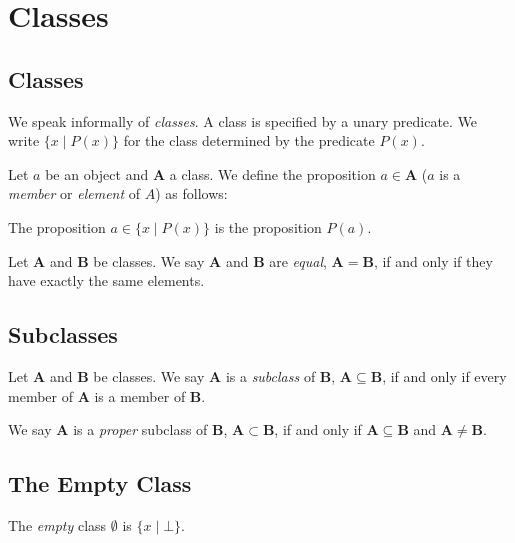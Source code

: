 \chapter{Classes}

\section{Classes}

We speak informally of \emph{classes}. A class is specified by a unary predicate.
We write $\{ x \mid P(x) \}$ for the class determined by the predicate $P(x)$.

\begin{definition}[Membership]
    Let $a$ be an object and $\mathbf{A}$ a class. We define the proposition $a \in \mathbf{A}$
    ($a$ is a \emph{member} or \emph{element} of $A$)
    as follows:

    The proposition $a \in \{ x \mid P(x) \}$ is the proposition $P(a)$.
\end{definition}

\begin{definition}
    Let $\mathbf{A}$ and $\mathbf{B}$ be classes. We say $\mathbf{A}$
    and $\mathbf{B}$ are \emph{equal}, $\mathbf{A} = \mathbf{B}$, if and only if
    they have exactly the same elements.
\end{definition}

\section{Subclasses}

\begin{definition}[Subclass]
    Let $\mathbf{A}$ and $\mathbf{B}$ be classes. 
    We say $\mathbf{A}$ is a \emph{subclass} of $\mathbf{B}$, 
    $\mathbf{A} \subseteq \mathbf{B}$, if and only if every member of 
    $\mathbf{A}$ is a member of $\mathbf{B}$.

    We say $\mathbf{A}$ is a \emph{proper} subclass of $\mathbf{B}$, 
    $\mathbf{A} \subset \mathbf{B}$, if and only if $\mathbf{A} \subseteq
    \mathbf{B}$ and $\mathbf{A} \neq \mathbf{B}$.
\end{definition}

\section{The Empty Class}

\begin{definition}
    The \emph{empty} class $\emptyset$ is $\{x \mid \bot \}$.
\end{definition}

